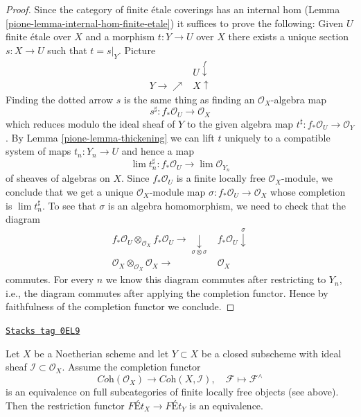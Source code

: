 \begin{proof}

Since the category of finite \'etale coverings has an
internal hom (Lemma \ref{pione-lemma-internal-hom-finite-etale})
it suffices to prove the following: Given $U$ finite \'etale over $X$
and a morphism $t : Y \to U$ over $X$ there exists a unique section
$s : X \to U$ such that $t = s|_Y$. Picture
$$
\begin{array}{cc} & U \overset{f}{\downarrow} \\ Y \longrightarrow\nearrow & X \uparrow\end{array}
$$
Finding the dotted arrow $s$ is the same thing as finding an
$\mathcal{O}_X$-algebra map
$$
s^\sharp : f_*\mathcal{O}_U \longrightarrow \mathcal{O}_X
$$
which reduces modulo the ideal sheaf of $Y$ to the given algebra map
$t^\sharp : f_*\mathcal{O}_U \to \mathcal{O}_Y$.
By Lemma \ref{pione-lemma-thickening} we can lift $t$ uniquely to a compatible
system of maps $t_n : Y_n \to U$ and hence a map
$$
\lim t_n^\sharp : f_*\mathcal{O}_U \longrightarrow \lim \mathcal{O}_{Y_n}
$$
of sheaves of algebras on $X$.
Since $f_*\mathcal{O}_U$ is a finite locally free $\mathcal{O}_X$-module,
we conclude that we get a unique $\mathcal{O}_X$-module map
$\sigma : f_*\mathcal{O}_U \to \mathcal{O}_X$ whose completion
is $\lim t_n^\sharp$. To see that $\sigma$ is an algebra homomorphism,
we need to check that the diagram
$$
\begin{array}{cc}f_*\mathcal{O}_U \otimes_{\mathcal{O}_X} f_*\mathcal{O}_U
\longrightarrow\underset{\sigma \otimes \sigma}{\downarrow} & f_*\mathcal{O}_U \overset{\sigma}{\downarrow} \\ \mathcal{O}_X \otimes_{\mathcal{O}_X} \mathcal{O}_X \longrightarrow & \mathcal{O}_X\end{array}
$$
commutes. For every $n$ we know this diagram commutes after restricting
to $Y_n$, i.e., the diagram commutes after applying the completion functor.
Hence by faithfulness of the completion functor we conclude.
\end{proof}

\begin{lemma}
\label{pione-lemma-restriction-equivalence}
\href{https://stacks.math.columbia.edu/tag/0EL9}{\texttt{Stacks tag 0EL9}}

Let $X$ be a Noetherian scheme and let $Y \subset X$ be a closed subscheme
with ideal sheaf $\mathcal{I} \subset \mathcal{O}_X$.
Assume the completion functor
$$
\textit{Coh}(\mathcal{O}_X)
\longrightarrow
\textit{Coh}(X, \mathcal{I}),\quad
\mathcal{F} \longmapsto \mathcal{F}^\wedge
$$
is an equivalence on full subcategories of finite locally free objects
(see above).
Then the restriction functor $\textit{F\'Et}_X \to \textit{F\'Et}_Y$
is an equivalence.
\end{lemma}

